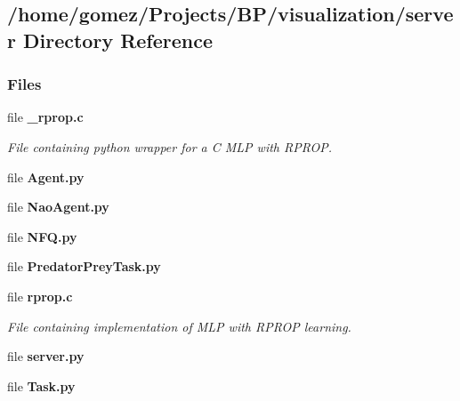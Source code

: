 \subsection{/home/gomez/\+Projects/\+B\+P/visualization/server Directory Reference}
\label{dir_41e1742e44e2de38b3bc91f993fed282}
\subsubsection*{Files}
\begin{DoxyCompactItemize}
\item 
file {\bf \+\_\+rprop.\+c}
\begin{DoxyCompactList}\small\item\em File containing python wrapper for a C M\+L\+P with R\+P\+R\+O\+P. \end{DoxyCompactList}\item 
file {\bfseries Agent.\+py}
\item 
file {\bfseries Nao\+Agent.\+py}
\item 
file {\bfseries N\+F\+Q.\+py}
\item 
file {\bfseries Predator\+Prey\+Task.\+py}
\item 
file {\bf rprop.\+c}
\begin{DoxyCompactList}\small\item\em File containing implementation of M\+L\+P with R\+P\+R\+O\+P learning. \end{DoxyCompactList}\item 
file {\bfseries server.\+py}
\item 
file {\bfseries Task.\+py}
\end{DoxyCompactItemize}

